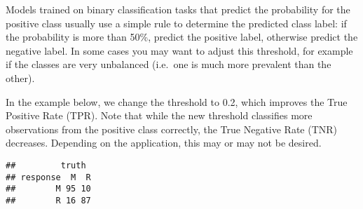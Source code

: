 \documentclass[
]{scrbook}
\newenvironment{Shaded}{\begin{snugshade}}{\end{snugshade}}
\newcommand{\AttributeTok}[1]{\textcolor[rgb]{0.77,0.63,0.00}{#1}}
\newcommand{\CommentTok}[1]{\textcolor[rgb]{0.56,0.35,0.01}{\textit{#1}}}
\newcommand{\FunctionTok}[1]{\textcolor[rgb]{0.00,0.00,0.00}{#1}}
\newcommand{\NormalTok}[1]{#1}
\newcommand{\OtherTok}[1]{\textcolor[rgb]{0.56,0.35,0.01}{#1}}
\newcommand{\SpecialCharTok}[1]{\textcolor[rgb]{0.00,0.00,0.00}{#1}}
\newcommand{\StringTok}[1]{\textcolor[rgb]{0.31,0.60,0.02}{#1}}
\renewenvironment{Shaded} {\begin{snugshade}\small} {\end{snugshade}}
\begin{document}
Models trained on binary classification tasks that predict the probability for the positive class usually use a simple rule to determine the predicted class label: if the probability is more than 50\%, predict the positive label, otherwise predict the negative label.
In some cases you may want to adjust this threshold, for example if the classes are very unbalanced (i.e.~one is much more prevalent than the other).

In the example below, we change the threshold to 0.2, which improves the True Positive Rate (TPR).
Note that while the new threshold classifies more observations from the positive class correctly, the True Negative Rate (TNR) decreases.
Depending on the application, this may or may not be desired.

\begin{Shaded}
\end{Shaded}

\begin{verbatim}
##         truth
## response  M  R
##        M 95 10
##        R 16 87
\end{verbatim}

\begin{Shaded}
\end{Shaded}
\end{document}
